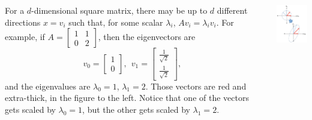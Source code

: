 \documentclass{beamer}
\begin{document}
\begin{frame}
  \begin{columns}[t]
    \column{2.75in}
    \begin{block}{}
      For a $d$-dimensional square matrix, there may be up to $d$
        different directions ${x}={v}_i$ such that, for some
        scalar $\lambda_i$, $A{v}_i=\lambda_i{v}_i$.
        For example, if
        $A=\left[\begin{array}{cc}1&1\\0&2\end{array}\right]$, then the
        eigenvectors are
        \[
        {v}_0=\left[\begin{array}{c}1\\0\end{array}\right],~~
        {v}_1=\left[\begin{array}{c}\frac{1}{\sqrt{2}}\\\frac{1}{\sqrt{2}}\end{array}\right],~~
        \]
        and the eigenvalues are $\lambda_0=1$, $\lambda_1=2$.
        Those vectors are red and extra-thick, in the figure to the
        left.  Notice that one of the vectors gets scaled by $\lambda_0=1$, but
        the other gets scaled by $\lambda_1=2$.
    \end{block}
    \column{1.5in}
    \begin{block}{}
      \includegraphics[width=1.45in]{linalg_review_fig2.png}
    \end{block}
  \end{columns}
\end{frame}
\end{document}
